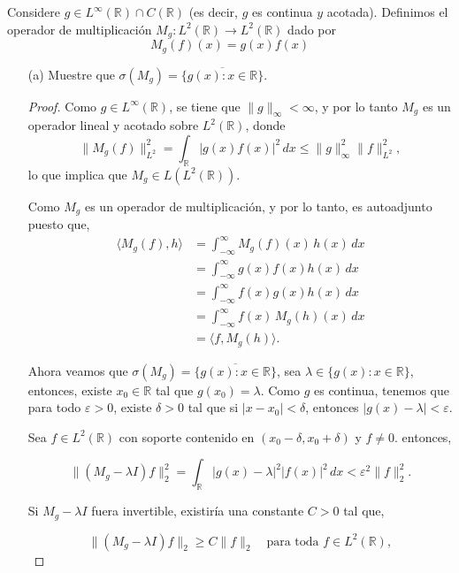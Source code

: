  Considere $g \in L^{\infty}(\mathbb{R}) \cap C(\mathbb{R})$ (es decir, $g$ es continua $y$ acotada). Definimos el operador de multiplicación $M_g: L^2(\mathbb{R}) \rightarrow L^2(\mathbb{R})$ dado por
$$
M_g(f)(x)=g(x) f(x)
$$
\begin{itemize}
    \item[(a)] Muestre que $\sigma\left(M_g\right)=\overline{\{g(x): x \in \mathbb{R}\}}$.

\begin{proof}
    


Como \( g \in L^\infty(\mathbb{R}) \), se tiene que \( \|g\|_\infty < \infty \), y por lo tanto \( M_g \) es un operador lineal y acotado sobre \( L^2(\mathbb{R}) \), donde
\[
\|M_g(f)\|_{L^2}^2 = \int_{\mathbb{R}} |g(x)f(x)|^2 \, dx \leq \|g\|_\infty^2 \|f\|_{L^2}^2,
\]
lo que implica que \( M_g \in L(L^2(\mathbb{R})) \).

Como \( M_g \) es un operador de multiplicación, y por lo tanto, es autoadjunto puesto que,
\[
\begin{aligned}
\langle M_g(f), h \rangle &= \int_{-\infty}^{\infty} M_g(f)(x) \, h(x) \, dx \\
&= \int_{-\infty}^{\infty} g(x)f(x)h(x) \, dx \\
&= \int_{-\infty}^{\infty} f(x)g(x)h(x) \, dx \\
&= \int_{-\infty}^{\infty} f(x) \, M_g(h)(x) \, dx \\
&= \langle f, M_g(h) \rangle.
\end{aligned}
\]


Ahora veamos que  $\sigma\left(M_g\right)=\overline{\{g(x): x \in \mathbb{R}\}}$, sea $\lambda \in \{g(x) : x \in \mathbb{R}\}$, entonces, existe $x_0 \in \mathbb{R}$ tal que $g(x_0) = \lambda$. Como $g$ es continua, tenemos que para todo $\varepsilon > 0$, existe $\delta > 0$ tal que si $|x - x_0| < \delta$, entonces $|g(x) - \lambda| < \varepsilon$.

Sea $f \in L^2(\mathbb{R})$ con soporte contenido en $(x_0 - \delta, x_0 + \delta)$ y $f \neq 0$. entonces,

\[
\|(M_g - \lambda I)f\|_2^2 = \int_{\mathbb{R}} |g(x) - \lambda|^2 |f(x)|^2 \, dx < \varepsilon^2 \|f\|_2^2.
\]

Si $M_g - \lambda I$ fuera invertible, existiría una constante $C > 0$ tal que,

\[
\|(M_g - \lambda I)f\|_2 \geq C \|f\|_2 \quad \text{para toda } f \in L^2(\mathbb{R}),
\]


\end{proof}
\end{itemize}
